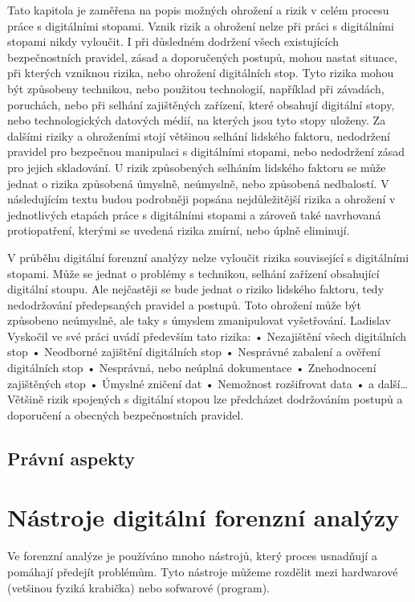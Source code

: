 \documentclass[thesis=B,czech]{FITthesis}[2012/06/26]
\begin{document}
Tato kapitola je zaměřena na popis možných ohrožení a rizik v celém procesu práce
s digitálními stopami. Vznik rizik a ohrožení nelze při práci s digitálními stopami nikdy
vyloučit. I při důsledném dodržení všech existujících bezpečnostních pravidel, zásad
a doporučených postupů, mohou nastat situace, při kterých vzniknou rizika, nebo ohrožení
digitálních stop. Tyto rizika mohou být způsobeny technikou, nebo použitou technologií,
například při závadách, poruchách, nebo při selhání zajištěných zařízení, které obsahují
digitální stopy, nebo technologických datových médií, na kterých jsou tyto stopy uloženy.
Za dalšími riziky a ohroženími stojí většinou selhání lidského faktoru, nedodržení pravidel
pro bezpečnou manipulaci s digitálními stopami, nebo nedodržení zásad pro jejich
skladování. U rizik způsobených selháním lidského faktoru se může jednat o rizika
způsobená úmyslně, neúmyslně, nebo způsobená nedbalostí. V následujícím textu budou
podrobněji popsána nejdůležitější rizika a ohrožení v jednotlivých etapách práce
s digitálními stopami a zároveň také navrhovaná protiopatření, kterými se uvedená rizika
zmírní, nebo úplně eliminují.
\cite{for_baka}

V průběhu digitální forenzní analýzy nelze vyloučit rizika související s digitálními stopami.
Může se jednat o problémy s technikou, selhání zařízení obsahující digitální stoupu. Ale
nejčastěji se bude jednat o riziko lidského faktoru, tedy nedodržování předepsaných pravidel
a postupů. Toto ohrožení může být způsobeno neúmyslně, ale taky s úmyslem zmanipulovat
vyšetřování. Ladislav Vyskočil ve své práci uvádí především tato rizika:
• Nezajištění všech digitálních stop
• Neodborné zajištění digitálních stop
• Nesprávné zabalení a ověření digitálních stop
• Nesprávná, nebo neúplná dokumentace
• Znehodnocení zajištěných stop
• Úmyslné zničení dat
• Nemožnost rozšifrovat data
• a další…
Většině rizik spojených s digitální stopou lze předcházet dodržováním postupů a doporučení
a obecných bezpečnostních pravidel.

\section{Právní aspekty}


\chapter{Nástroje digitální forenzní analýzy}

Ve forenzní analýze je používáno mnoho nástrojů, který proces usnadňují a pomáhají předejít problémům. Tyto nástroje můžeme rozdělit mezi hardwarové (vetšinou fyziká krabička) nebo sofwarové (program).
\end{document}
